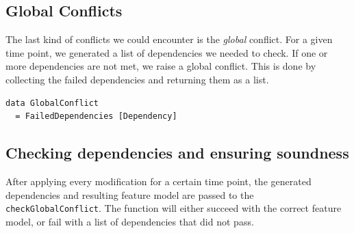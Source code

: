 \documentclass[a4paper,english]{ifimaster}
\begin{document}
\subsection{Global Conflicts}%
\label{sub:global_conflicts}

The last kind of conflicts we could encounter is the \textit{global} conflict. For a given time point, we generated a list of dependencies we needed to check. If one or more dependencies are not met, we raise a global conflict. This is done by collecting the failed dependencies and returning them as a list.

\begin{verbatim}
data GlobalConflict
  = FailedDependencies [Dependency]
\end{verbatim}

\subsection{Checking dependencies and ensuring soundness}%
\label{sub:checking_dependencies_and_ensuring_soundness}

After applying every modification for a certain time point, the generated dependencies and resulting feature model are passed to the \texttt{checkGlobalConflict}. The function will either succeed with the correct feature model, or fail with a list of dependencies that did not pass.
\end{document}
